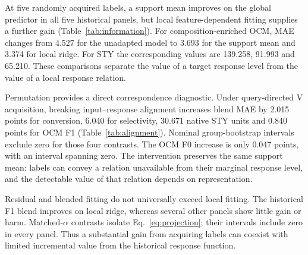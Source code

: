\documentclass[11pt]{article}
\newcommand{\styunit}{mg\,MeOH\,h$^{-1}$\,g$_{cat}^{-1}$}
\begin{document}
At five randomly acquired labels, a support mean improves on the global predictor in all five historical panels, but local feature-dependent fitting supplies a further gain (Table~\ref{tab:information}). For composition-enriched OCM, MAE changes from 4.527 for the unadapted model to 3.693 for the support mean and 3.374 for local ridge. For STY the corresponding values are 139.258, 91.993 and 65.210. These comparisons separate the value of a target response level from the value of a local response relation.
\begin{table}[htbp]\centering\small
\caption{Five-label historical information controls, with the same random supports within each panel. Errors are source-equal MAE; the global control consumes zero target labels. STY is in \styunit; other outcomes are in percentage points.}\label{tab:information}

\end{table}

Permutation provides a direct correspondence diagnostic. Under query-directed V acquisition, breaking input--response alignment increases blend MAE by 2.015 points for conversion, 6.040 for selectivity, 30.671 native STY units and 0.840 points for OCM F1 (Table~\ref{tab:alignment}). Nominal group-bootstrap intervals exclude zero for those four contrasts. The OCM F0 increase is only 0.047 points, with an interval spanning zero. The intervention preserves the same support mean: labels can convey a relation unavailable from their marginal response level, and the detectable value of that relation depends on representation.
\begin{table}[htbp]\centering\small
\caption{Support-label permutation under the same five-label query-V designs. Intervals are exploratory conditional 95\% group-bootstrap intervals, without a new family-adjusted claim.}\label{tab:alignment}

\end{table}

Residual and blended fitting do not universally exceed local fitting. The historical F1 blend improves on local ridge, whereas several other panels show little gain or harm. Matched-$\alpha$ contrasts isolate Eq.~\ref{eq:projection}; their intervals include zero in every panel. Thus a substantial gain from acquiring labels can coexist with limited incremental value from the historical response function.
\end{document}
